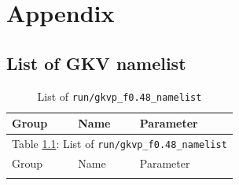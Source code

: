 \appendix
\chapter{Appendix}
\label{chap:Appendix}

\section{List of GKV namelist}
\label{sec:List of GKV namelist}


\begin{longtable}{ l | l | p{10cm} }
  \caption{List of \texttt{run/gkvp\_f0.48\_namelist}}
  \label{table:List of run/gkvp_f0.48_namelist} \\
  \hline Group & Name & Parameter \\ \hline\hline
  \endfirsthead
  \multicolumn{3}{r}{Table \ref{table:List of run/gkvp_f0.48_namelist}: List of \texttt{run/gkvp\_f0.48\_namelist}}\\
  \hline Group & Name & Parameter \\ \hline\hline
  \endhead
  \hline
  \endfoot
  \hline
  \endlastfoot


\end{longtable}
